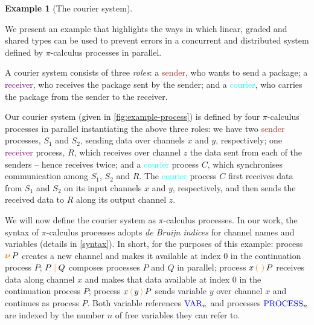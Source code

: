 \documentclass[sigplan,10pt,anonymous,review]{acmart}
\theoremstyle{definition}
\newtheorem{example}{Example}
\newcommand{\picalc}{$\pi$-calculus}
\newcommand{\type}[1]{\textcolor{blue}{\operatorname{#1}}}
\newcommand{\constr}[1]{\textcolor{orange}{\operatorname{#1}}}
\newcommand{\func}[1]{\textcolor{teal}{\operatorname{#1}}}
\newcommand{\comp}[2]{#1 \, \constr{\parallel} \, #2}
\newcommand{\new}{\constr{\boldsymbol{\nu}} \,}
\newcommand{\send}[2]{#1 \, \constr{\langle} \, #2 \,\constr{\rangle} \,}
\newcommand{\recv}[2]{#1 \, \constr{\mathbb{(}} \, #2 \, \constr{\mathbb{)}} \,}
\newcommand{\Var}{\type{VAR}}
\newcommand{\Process}{\type{PROCESS}}
\newcommand{\sender}{\textcolor{brown}{sender}}
\newcommand{\receiver}{\textcolor{purple}{receiver}}
\newcommand{\courier}{\textcolor{cyan}{courier}}
\begin{document}
\begin{example}[The courier system]
\label{example-process}

We present an example that highlights the ways in which linear, graded and shared types can be used to prevent errors in a concurrent and distributed system defined by \picalc{} processes in parallel.

A courier system consists of three \emph{roles}:
a \sender{}, who wants to send a package;
a \receiver{}, who receives the package sent by the sender;
and a \courier{}, who carries the package from the sender to the receiver.

Our courier system (given in \autoref{fig:example-process}) is defined by four \picalc{} processes in parallel instantiating the above three roles:
we have two \sender{} processes, $S_1$ and $S_2$, sending data over channels $x$ and $y$, respectively;
one \receiver{} process, $R$, which receives over channel $z$ the data sent from each of the senders -- hence receives twice;
and a \courier{} process $C$, which synchronises communication among $S_1$, $S_2$ and $R$.
The \courier{} process $C$ first receives data from $S_1$ and $S_2$ on its input channels $x$ and $y$, respectively, and then sends the received data to $R$ along its output channel $z$.


We will now define the courier system as \picalc{} processes.
In our work, the syntax of \picalc{} processes adopts \emph{de Bruijn indices} \cite{deBruijn1972} for channel names and variables (details in \autoref{syntax}).
In short, for the purposes of this example:
process $\new{} P$ creates a new channel and makes it available at index $0$ in the continuation process $P$;
$\comp{P}{Q}$ composes processes $P$ and $Q$ in parallel; process $\recv{x}{}P$ receives data along channel $x$ and makes that data available at index $0$ in the continuation process $P$;
process $\send{x}{y}{P}$ sends variable $y$ over channel $x$ and continues as process $P$.
Both variable references $\Var_n$ and processes $\Process_n$ are indexed by the number $n$ of free variables they can refer to.

\begin{figure}[t]
  \small
  \centering
\end{figure}
\end{example}
\end{document}
